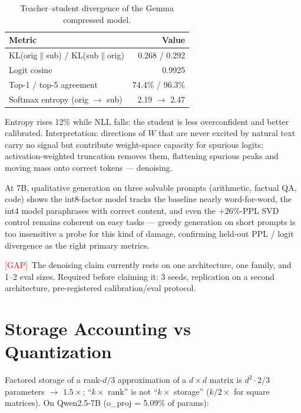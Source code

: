 \documentclass[11pt]{article}
\newcommand{\gap}{\textcolor{red}{[GAP]}}
\begin{document}
\begin{table}[h]
\centering
\begin{tabular}{lr}
\toprule
Metric & Value \\
\midrule
KL(orig$\|$sub) / KL(sub$\|$orig) & 0.268 / 0.292 \\
Logit cosine                      & 0.9925 \\
Top-1 / top-5 agreement           & 74.4\% / 96.3\% \\
Softmax entropy (orig $\to$ sub)  & 2.19 $\to$ 2.47 \\
\bottomrule
\end{tabular}
\caption{Teacher--student divergence of the Gemma compressed model.}
\label{tab:divergence}
\end{table}

Entropy rises 12\% while NLL falls: the student is less overconfident and
better calibrated. Interpretation: directions of $W$ that are never excited
by natural text carry no signal but contribute weight-space capacity for
spurious logits; activation-weighted truncation removes them, flattening
spurious peaks and moving mass onto correct tokens --- denoising.

At 7B, qualitative generation on three solvable prompts (arithmetic,
factual QA, code) shows the int8-factor model tracks the baseline nearly
word-for-word, the int4 model paraphrases with correct content, and even
the $+26\%$-PPL SVD control remains coherent on easy tasks --- greedy
generation on short prompts is too insensitive a probe for this kind of
damage, confirming held-out PPL / logit divergence as the right primary
metrics.

\gap\ The denoising claim currently rests on one architecture, one family,
and 1--2 eval sizes. Required before claiming it: 3 seeds, replication on a
second architecture, pre-registered calibration/eval protocol.

\section{Storage Accounting vs Quantization}\label{sec:storage}

Factored storage of a rank-$d/3$ approximation of a $d\times d$ matrix is
$d^2 \cdot 2/3$ parameters $\to$ $1.5\times$; ``$k\times$ rank'' is not
``$k\times$ storage'' ($k/2\times$ for square matrices). On Qwen2.5-7B
(o\_proj = 5.09\% of params):
\end{document}
